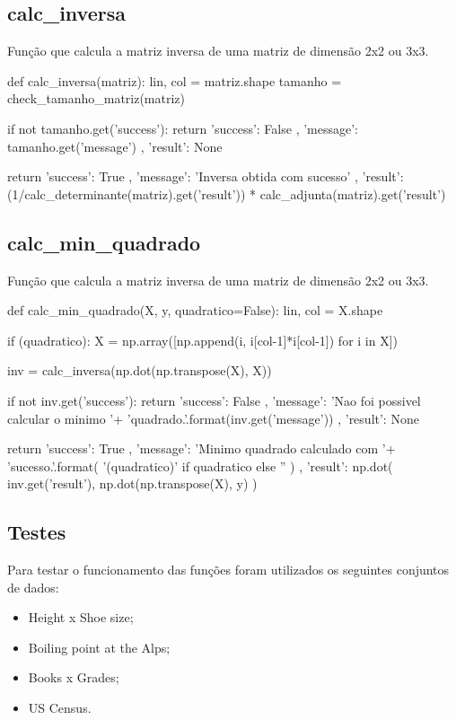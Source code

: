 \documentclass[a4paper, 11pt]{article}
\begin{document}
\newpage
\subsection*{calc\_inversa}
Função que calcula a matriz inversa de uma matriz de dimensão 2x2 ou 3x3.

\begin{python}[language=Python]
def calc_inversa(matriz):
    lin, col = matriz.shape
    tamanho = check_tamanho_matriz(matriz)
    
    if not tamanho.get('success'):
        return {
            'success': False
            , 'message': tamanho.get('message')
            , 'result': None
        }
    
    return {
        'success': True
        , 'message': 'Inversa obtida com sucesso'
        , 'result': 
            (1/calc_determinante(matriz).get('result')) * 
            calc_adjunta(matriz).get('result')
    }
\end{python}

\newpage
\subsection*{calc\_min\_quadrado}
Função que calcula a matriz inversa de uma matriz de dimensão 2x2 ou 3x3.

\begin{python}[language=Python]
def calc_min_quadrado(X, y, quadratico=False):
    lin, col = X.shape
    
    if (quadratico):
        X = np.array([np.append(i, i[col-1]*i[col-1]) for i in X])
    
    inv = calc_inversa(np.dot(np.transpose(X), X))
    
    if not inv.get('success'):
        return {
            'success': False
            , 'message': 'Nao foi possivel calcular o minimo '+
                         'quadrado.\n {}'.format(inv.get('message'))
            , 'result': None
        }
    
    return {
        'success': True
        , 'message': 'Minimo quadrado {} calculado com '+
                     'sucesso.'.format(
                         '(quadratico)' if quadratico else ''
                     )
        , 'result': np.dot(
                        inv.get('result'),
                        np.dot(np.transpose(X), y)
                    )
    }
\end{python}

\subsection*{Testes}
Para testar o funcionamento das funções foram utilizados os seguintes conjuntos de dados:
\begin{itemize}
\item Height x Shoe size;
\item Boiling point at the Alps;
\item Books x Grades;
\item US Census.
\end{itemize}
\end{document}

